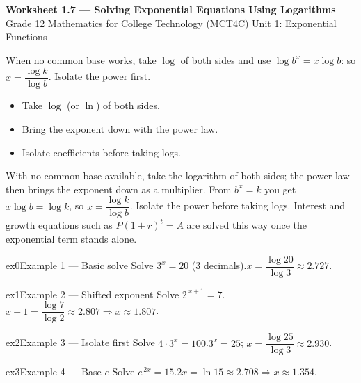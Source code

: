 \documentclass[11pt]{article}
\begin{document}
\begin{center}
{\LARGE\bfseries\color{titleblue}Worksheet 1.7 --- Solving Exponential Equations Using Logarithms}\\[2pt]
{\small Grade 12 Mathematics for College Technology (MCT4C) \textperiodcentered{} Unit 1: Exponential Functions}
\end{center}

\begin{ideabox}
When no common base works, take $\log$ of both sides and use $\log b^{x}=x\log b$: so $x=\dfrac{\log k}{\log b}$. Isolate the power first.
\begin{itemize}[leftmargin=*,itemsep=2pt]
  \item Take $\log$ (or $\ln$) of both sides.
  \item Bring the exponent down with the power law.
  \item Isolate coefficients before taking logs.
\end{itemize}
\end{ideabox}

\begin{learnbox}
With no common base available, take the logarithm of both sides; the power law then brings the exponent down as a multiplier.
From $b^x=k$ you get $x\log b=\log k$, so $x=\dfrac{\log k}{\log b}$. Isolate the power before taking logs.
Interest and growth equations such as $P(1+r)^t=A$ are solved this way once the exponential term stands alone.
\end{learnbox}


\begin{example}{ex0}{Example 1 --- Basic solve}
Solve $3^{x}=20$ (3 decimals).\soln $x=\dfrac{\log 20}{\log 3}\approx2.727$.
\end{example}

\begin{example}{ex1}{Example 2 --- Shifted exponent}
Solve $2^{\,x+1}=7$.\soln $x+1=\dfrac{\log 7}{\log 2}\approx2.807\Rightarrow x\approx1.807$.
\end{example}

\begin{example}{ex2}{Example 3 --- Isolate first}
Solve $4\cdot3^{x}=100$.\soln $3^x=25$; $x=\dfrac{\log 25}{\log 3}\approx2.930$.
\end{example}

\begin{example}{ex3}{Example 4 --- Base $e$}
Solve $e^{\,2x}=15$.\soln $2x=\ln 15\approx2.708\Rightarrow x\approx1.354$.
\end{example}
\end{document}
